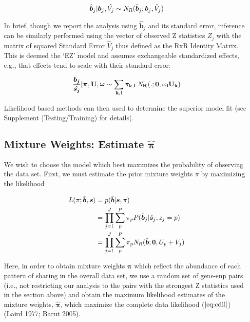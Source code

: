 \begin{enumerate}
\begin{equation}
\hat{\bm{b}}_{j} | \bm{b}_{j}, \hat{V_{j}} \sim {\it N}_R(\hat{\bm{b}}_{j}; \bm{b}_{j}, \hat{V}_{j})
\label{eqn:new_lik}
\end{equation}

In brief, though we report the analysis using $\hat{\bm{b}}_{j}$ and its standard error, inference can be similarly performed using the vector of observed Z statistics ${Z}_{j}$ with the matrix of squared Standard Error $\hat{V}_{j}$ thus defined as the RxR Identity Matrix. This is deemed the `EZ' model and assumes exchangeable standardized effects, e.g., that effects tend to scale with their standard error:

 \begin{equation}
  \frac{\bm{b_{j}}}{\bm{\hat{s_{j}}}} | \bm{\pi},\bf{U}, \bm{\omega} \sim \sum_{k,l} \pi_{k,l} \;{\it N}_R(.; \bm{0}, \omega_l U_{k})
\end{equation}

Likelihood based methods can then used to determine the superior model fit (see Supplement (Testing/Training) for details).

\subsection{Mixture Weights: Estimate $\hat{\bm{\pi}}$}\label{sssec:ebweights}
We wish to choose the model which best maximizes the probability of observing the data set. First, we must estimate the prior mixture weights $\pi$ by maximizing the likelihood 

\begin{equation}
\begin{aligned}
L(\pi;\hat{\bm{b}}, \bm{s}) &= p(\hat{\bm{b}} | \bm{s},\pi) \\
&= \prod_{j=1}^J \sum_{p}^{P} \pi_{p} P(\hat{\bm{b}}_{j} | \hat{\bm{s}}_{j}, z_{j}=p)\\
&= \prod_{j=1}^J \sum_{p}^{P} \pi_{p} {\it N}_R(\hat{\bm{b}}; \bm{0}, U_{p} + V_{j})
\label{eq:cdll}
\end{aligned}
\end{equation}



Here, in order to obtain mixture weights $\bm{\pi}$ which reflect the abundance of each pattern of sharing in the overall data set, we use a random set of gene-snp pairs (i.e., not restricting our analysis to the pairs with the strongest Z statistics used in the section above) and obtain the maximum likelihood estimates of the mixture weights, $\hat{\bm{\pi}}$, which maximize the complete data likelihood ($\ref{eq:cdll}$) (Laird 1977; Barut 2005).


\end{enumerate}

